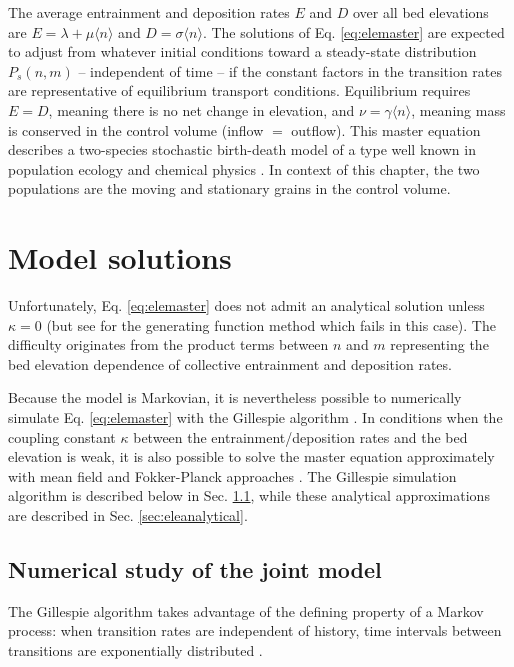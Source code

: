 The average entrainment and deposition rates $E$ and $D$ over all bed elevations are $E = \lambda +\mu \langle n \rangle$ and $D=\sigma \langle n \rangle$.
The solutions of Eq. \ref{eq:elemaster} are expected to adjust from whatever initial conditions toward a steady-state distribution $P_s(n,m)$ -- independent of time -- if the constant factors in the transition rates are representative of equilibrium transport conditions.
Equilibrium requires $E=D$, meaning there is no net change in elevation, and $\nu = \gamma \langle n \rangle$, meaning mass is conserved in the control volume (inflow $=$ outflow).
This master equation describes a two-species stochastic birth-death model \citep{Cox1965} of a type well known in population ecology \citep{Pielou1977, Swift2002} and chemical physics \citep{Gardiner1983}.
In context of this chapter, the two populations are the moving and stationary grains in the control volume.

\section{Model solutions}
\label{sec:elesolution}

Unfortunately, Eq. \ref{eq:elemaster} does not admit an analytical solution unless $\kappa=0$ (but see \citet{Swift2002} for the generating function method which fails in this case).
The difficulty originates from the product terms between $n$ and $m$ representing the bed elevation dependence of collective entrainment and deposition rates.

Because the model is Markovian, it is nevertheless possible to numerically simulate Eq. \ref{eq:elemaster} with the Gillespie algorithm \citep{Gillespie1977, Gillespie1991, Gillespie2007}. 
In conditions when the coupling constant $\kappa$ between the entrainment/deposition rates and the bed elevation is weak, it is also possible to solve the master equation approximately with mean field and Fokker-Planck approaches \citep{Haken1978,Gardiner1983}.
The Gillespie simulation algorithm is described below in Sec. \ref{sec:elenumerical}, while these analytical approximations are described in Sec. \ref{sec:eleanalytical}.

\subsection{Numerical study of the joint model}
\label{sec:elenumerical}

The Gillespie algorithm takes advantage of the defining property of a Markov process: when transition rates are independent of history, time intervals between transitions are
exponentially distributed \citep{Cox1965}.

